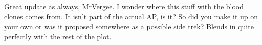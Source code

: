 Great update as always, MrVergee. I wonder where this stuff with the blood clones comes from. It isn't part of the actual AP, is it? So did you make it up on your own or was it proposed somewhere as a possible side trek? Blends in quite perfectly with the rest of the plot.\\

